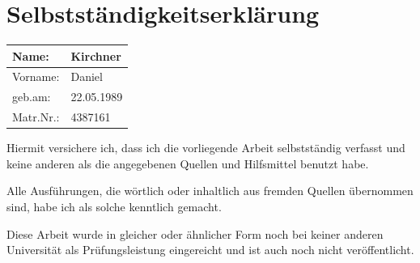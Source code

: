 \documentclass[a4paper,enabledeprecatedfontcommands,abstract=on,twoside=true]{scrreprt}
\numberwithin{TODO}{chapter}
\numberwithin{equation}{section}
\begin{document}
\cleardoublepage

\chapter*{Selbstst\"andigkeitserkl\"arung}

\begin{center}
\setlength\extrarowheight{4pt}
\begin{tabularx}{\textwidth}{|X|X|}
\hline
Name: & Kirchner \\
\hline
Vorname: & Daniel \\
\hline
geb.am: & 22.05.1989 \\
\hline
Matr.Nr.: & 4387161 \\
\hline
\end{tabularx}
\end{center}

Hiermit versichere ich, dass ich die vorliegende Arbeit selbstst\"andig
verfasst und keine anderen als die angegebenen Quellen und Hilfsmittel
benutzt habe.

Alle Ausf\"uhrungen, die w\"ortlich oder inhaltlich aus fremden Quellen
\"ubernommen sind, habe ich als solche kenntlich gemacht.

Diese Arbeit wurde in gleicher oder \"ahnlicher Form noch bei keiner
anderen Universit\"at als Pr\"ufungsleistung eingereicht und ist auch
noch nicht ver\"offentlicht.

\end{document}
